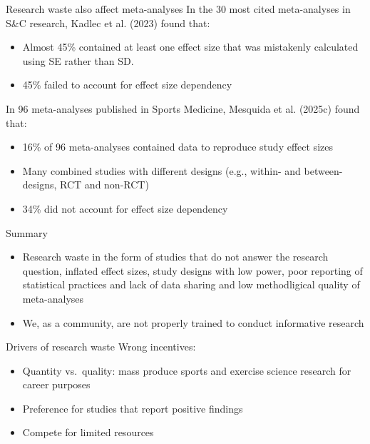\documentclass[
  ignorenonframetext,
]{beamer}
\begin{document}
\begin{frame}{Research waste also affect meta-analyses}
\protect{}\label{research-waste-also-affect-meta-analyses}
In the 30 most cited meta-analyses in S\&C research, Kadlec et al.
(2023) found that:

\begin{itemize}
\item
  Almost 45\% contained at least one effect size that was mistakenly
  calculated using SE rather than SD.
\item
  45\% failed to account for effect size dependency
\end{itemize}

In 96 meta-analyses published in Sports Medicine, Mesquida et al.
(2025c) found that:

\begin{itemize}
\item
  16\% of 96 meta-analyses contained data to reproduce study effect
  sizes
\item
  Many combined studies with different designs (e.g., within- and
  between-designs, RCT and non-RCT)
\item
  34\% did not account for effect size dependency
\end{itemize}
\end{frame}

\begin{frame}{Summary}
\protect{}\label{summary}
\begin{itemize}
\item
  Research waste in the form of studies that do not answer the research
  question, inflated effect sizes, study designs with low power, poor
  reporting of statistical practices and lack of data sharing and low
  methodligical quality of meta-analyses
\item
  We, as a community, are not properly trained to conduct informative
  research
\end{itemize}
\end{frame}

\begin{frame}{Drivers of research waste}
\protect{}\label{drivers-of-research-waste}
Wrong incentives:

\begin{itemize}
\item
  Quantity vs.~quality: mass produce sports and exercise science
  research for career purposes
\item
  Preference for studies that report positive findings
\item
  Compete for limited resources
\end{itemize}
\end{frame}
\end{document}
